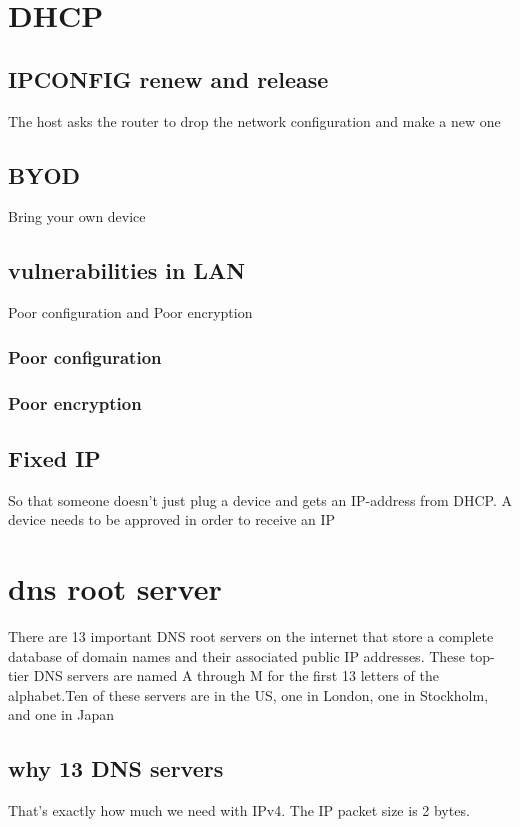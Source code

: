 \documentclass[a4paper,12pt]{book}
\begin{document}
\section{DHCP}

\subsection{IPCONFIG renew and release}
The host asks the router to drop the network configuration and make a new one

\subsection{BYOD}
Bring your own device

\subsection{vulnerabilities in LAN}
Poor configuration and Poor encryption

\subsubsection{Poor configuration}

\subsubsection{Poor encryption}


\subsection{Fixed IP}
So that someone doesn't just plug a device and gets an IP-address from DHCP. A device needs to be approved in order to receive an IP

\section{dns root server}
There are 13 important DNS root servers on the internet that store a complete database of domain names and their associated public IP addresses. These top-tier DNS servers are named A through M for the first 13 letters of the alphabet.Ten of these servers are in the US, one in London, one in Stockholm, and one in Japan 
\subsection{why 13 DNS servers}
That's exactly how much we need with IPv4. The IP packet size is 2 bytes.
\end{document}
